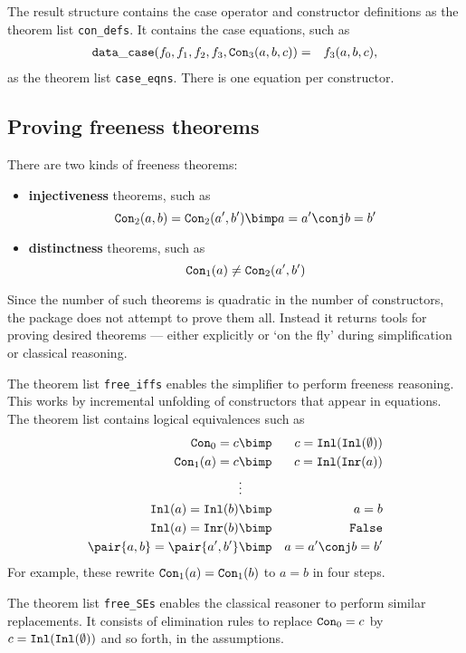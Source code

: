 The result structure contains the case operator and constructor definitions as
the theorem list \verb|con_defs|. It contains the case equations, such as 
\begin{eqnarray*}
  {\tt data\_case}(f_0,f_1,f_2,f_3,\hbox{\tt Con}_3(a,b,c)) & = & f_3(a,b,c),
\end{eqnarray*}
as the theorem list \verb|case_eqns|.  There is one equation per constructor.

\subsection{Proving freeness theorems}
There are two kinds of freeness theorems:
\begin{itemize}
\item {\bf injectiveness} theorems, such as
\[ \Con_2(a,b) = \Con_2(a',b') \bimp a=a' \conj b=b' \]

\item {\bf distinctness} theorems, such as
\[ \hbox{\tt Con}_1(a) \not= \hbox{\tt Con}_2(a',b')  \]
\end{itemize}
Since the number of such theorems is quadratic in the number of constructors,
the package does not attempt to prove them all.  Instead it returns tools for
proving desired theorems --- either explicitly or `on the fly' during
simplification or classical reasoning.

The theorem list \verb|free_iffs| enables the simplifier to perform freeness
reasoning.  This works by incremental unfolding of constructors that appear in
equations.  The theorem list contains logical equivalences such as
\begin{eqnarray*}
  \Con_0=c      & \bimp &  c=\Inl(\Inl(\emptyset))     \\
  \Con_1(a)=c   & \bimp &  c=\Inl(\Inr(a))             \\
                & \vdots &                             \\
  \Inl(a)=\Inl(b)   & \bimp &  a=b                     \\
  \Inl(a)=\Inr(b)   & \bimp &  {\tt False}             \\
  \pair{a,b} = \pair{a',b'} & \bimp & a=a' \conj b=b'
\end{eqnarray*}
For example, these rewrite $\hbox{\tt Con}_1(a)=\hbox{\tt Con}_1(b)$ to $a=b$ in four steps.

The theorem list \verb|free_SEs| enables the classical
reasoner to perform similar replacements.  It consists of elimination rules
to replace $\hbox{\tt Con}_0=c$ by $c=\hbox{\tt Inl}(\hbox{\tt Inl}(\emptyset))$ and so forth, in the
assumptions.

